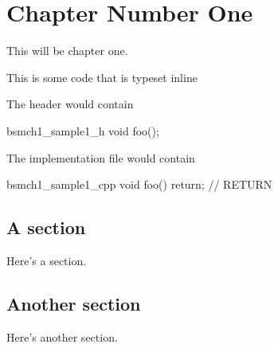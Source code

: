 \chapter{Chapter Number One}

This will be chapter one.

This is some code that is typeset inline 

The header would contain
\begin{cppcodeblock}{bsmch1_sample1_h}
void foo();
\end{cppcodeblock}

The implementation file would contain
\begin{cppcodeblock}{bsmch1_sample1_cpp}
void foo() {
  return;                                                             // RETURN
}
\end{cppcodeblock}

\section{A section}

Here's a section.

\section{Another section}

Here's another section.


